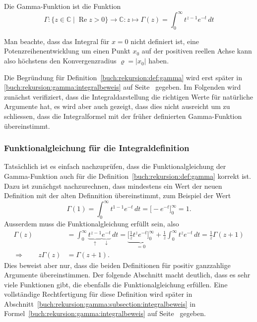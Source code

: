 \begin{definition}
\label{buch:rekursion:def:gamma}
Die Gamma-Funktion ist die Funktion 
\begin{equation}
\Gamma
\colon
\{z\in\mathbb{C} \mid \operatorname{Re}z>0\}
\to \mathbb{C}
:
z
\mapsto
\Gamma(z) = \int_0^\infty t^{z-1}e^{-t}\,dt
\label{buch:rekursion:eqn:gammaintegral}
\end{equation}
%
%
\end{definition}

Man beachte, dass das Integral für $x=0$ nicht definiert ist, eine
Potenzreihenentwicklung um einen Punkt $x_0$ auf der positiven reellen
Achse kann also höchstens den Konvergenzradius $\varrho=|x_0|$ haben.

Die Begründung für Definition~\ref{buch:rekursion:def:gamma} wird erst
später in \eqref{buch:rekursion:gamma:integralbeweis} auf
Seite~\pageref{buch:rekursion:gamma:integralbeweis} gegeben.
Im Folgenden wird zunächst verifiziert, dass die Integraldarstellung
die richtigen Werte für natürliche Argumente hat, es wird aber auch
gezeigt, dass dies nicht ausreicht um zu schliessen, dass die
Integralformel mit der früher definierten Gamma-Funktion übereinstimmt.

%
%
\subsubsection{Funktionalgleichung für die Integraldefinition}
Tatsächlich ist es einfach nachzuprüfen, dass die Funktionalgleichung
der Gamma-Funktion auch für die Definition~\ref{buch:rekursion:def:gamma}
korrekt ist. 
Dazu ist zunächgst nachzurechnen, dass mindestens ein Wert der neuen 
Definition mit der alten Definnition übereinstimmt, zum Beispiel der
Wert
\[
\Gamma(1)
=
\int_0^\infty t^{1-1}e^{-t}\,dt
=
\biggl[ -e^{-t} \biggr]_0^\infty
=
1.
\]
Ausserdem muss die Funktionalgleichung erfüllt sein, also
\begin{align*}
\Gamma(z)
&=
\int_0^\infty
\underbrace{t^{z-1}}_{\displaystyle\uparrow}
\underbrace{e^{-t}}_{\displaystyle\downarrow}
\,dt
=
\underbrace{\biggl[
\frac{1}{z} t^z e^{-t}
\biggr]_0^\infty}_{\displaystyle=0}
+
\frac{1}{z}
\int_0^\infty
t^z e^{-t}
\,dt
=
\frac{1}{z}\Gamma(z+1)
\\
\Rightarrow\qquad
z\Gamma(z)&=\Gamma(z+1).
\end{align*}
Dies beweist aber nur, dass die beiden Definitionen für positiv
ganzzahlige Argumente übereinstimmen.
Der folgende Abschnitt macht deutlich, dass es sehr viele Funktionen gibt,
die ebenfalls die Funktionalgleichung erfüllen.
Eine vollständige Rechtfertigung für diese Definition wird später
in Abschnitt~\ref{buch:rekursion:gamma:subsection:integralbeweis}
in Formel~\eqref{buch:rekursion:gamma:integralbeweis}
auf Seite~\pageref{buch:rekursion:gamma:integralbeweis}
gegeben.

